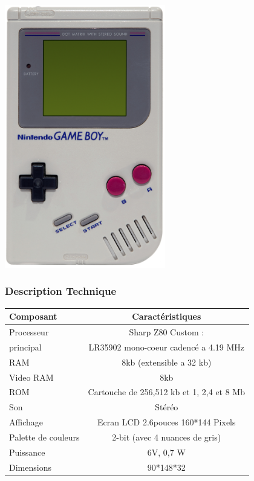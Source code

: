 \documentclass[12pt, a4paper]{article}
\begin{document}
\begin{center}
\includegraphics[width= 7cm]{nintendo-gameboy.jpg}
\end{center}

\pagebreak

\subsubsection{Description Technique}

\begin{center}
\begin{tabular}{|l|c|}
\hline
\bf Composant & \bf Caractéristiques \\
\hline 
Processeur & Sharp Z80 Custom : \\
principal & LR35902 mono-coeur cadencé a 4.19 MHz \\
\hline
RAM & 8kb (extensible a 32 kb) \\
\hline
Video RAM & 8kb\\
\hline
ROM & Cartouche de 256,512 kb et 1, 2,4 et 8 Mb\\
\hline
Son & Stéréo  \\
\hline 
Affichage & Ecran LCD 2.6pouces 160*144 Pixels  \\
\hline
Palette de couleurs & 2-bit (avec 4 nuances de gris) \\
\hline
Puissance & 6V, 0,7 W\\
\hline
Dimensions & 90*148*32 \\
\hline
\end{tabular}
\end{center}
\bigskip
\bigskip
\bigskip
\end{document}
